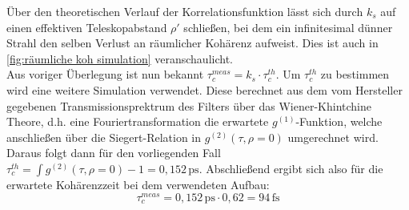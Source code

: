 Über den theoretischen Verlauf der Korrelationsfunktion lässt sich durch $k_s$ auf einen effektiven Teleskopabstand $\rho\prime$ schließen, bei dem ein infinitesimal dünner Strahl den selben Verlust an räumlicher Kohärenz aufweist. 
Dies ist auch in \autoref{fig:räumliche koh simulation} veranschaulicht. \\
Aus voriger Überlegung ist nun bekannt $\tau_c^{meas} = k_s\cdot\tau_c^{th}$. 
Um $\tau_c^{th}$ zu bestimmen wird eine weitere Simulation verwendet. 
Diese berechnet aus dem vom Hersteller gegebenen Transmissionsprektrum des Filters über das Wiener-Khintchine Theore, d.h. eine Fouriertransformation die erwartete $g^{(1)}$-Funktion, welche anschließen über die Siegert-Relation in $g^{(2)}(\tau, \rho=0)$ umgerechnet wird. 
Daraus folgt dann für den vorliegenden Fall $\tau_c^{th} = \int g^{(2)}(\tau, \rho=0) -1 = 0,152\,\mathrm{ps}$. 
Abschließend ergibt sich also für die erwartete Kohärenzzeit bei dem verwendeten Aufbau:
\begin{equation}
    \tau_c^{meas} = 0,152\,\mathrm{ps}\cdot 0,62 = 94\,\mathrm{fs}
\end{equation}



